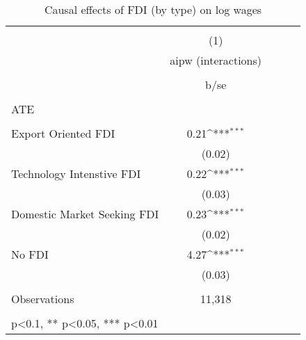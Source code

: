 \begin{table}
	\def\sym#1{\ifmmode^{#1}\else\(^{#1}\)\fi}
	\centering
	\caption{Causal effects of FDI (by type) on log wages}
	\label{4_table2}
	\begin{tabular}{l*{1}{cccc}}
		\hline\hline
		&\multicolumn{1}{c}{}                                        \\
		& (1)   \\
		\
		&aipw (interactions)     \\
		\\
		&b/se       \\
		\hline
		\\
		ATE \\
		\\
		Export Oriented FDI &       0.21\sym{***}   \\
		&     (0.02)        \\
		Technology Intenstive FDI&       0.22\sym{***} \\
		&     (0.03)         \\
		Domestic Market Seeking FDI&       0.23\sym{***}\\
		&     (0.02)   \\
		No FDI&       4.27\sym{***}\\
		&     (0.03)   \\
		\hline
		\\
		Observations        & 11,318          
		&                 &            \\
		\hline\hline
		\\
		\small * p<0.1, ** p<0.05, *** p<0.01
	\end{tabular} \\
\end{table}